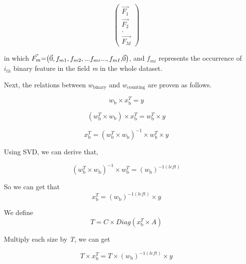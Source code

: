 \documentclass{sig-alternate}
\begin{document}
$$
\begin{pmatrix} 
\vec{F_1} \\
\vec{F_2} \\
.\\
\vec{F_M}

\end{pmatrix}
$$

\noindent in which \($$\vec{F_m}$$ = $$\begin{pmatrix} 
$$\vec{0 }$$ , f_{m1}, f_{m2}, ...f_{mi}... , f_{mI} ,$$\vec{0 }$$ 
\end{pmatrix}$$\), and \(f_{mi}\) represents the occurrence of \(i_{th}\) binary feature in the field \textsl{m} in the whole dataset.\vspace{5mm}

\noindent Next, the relations between \(w_{\text{binary}}\) and \(w_{\text{counting}}\) are proven as follows. 

\begin{equation}
w_{\text{b}} \times x_{\text{b}}^T = y 
\end{equation}

\begin{equation}
(w_{\text{b}}^T \times w_{\text{b}}) \times x_{\text{b}}^T = w_{\text{b}}^T \times y 
\end{equation}

\begin{equation}
x_{\text{b}}^T = (w_{\text{b}}^T \times w_{\text{b}})^{-1} \times w_{\text{b}}^T \times y 
\end{equation}

Using SVD, we can derive that,

\begin{equation}
(w_{\text{b}}^T \times w_{\text{b}})^{-1} \times w_{\text{b}}^T = (w_{\text{b}})^{-1(left)}  
\end{equation}

So we can get that 
\begin{equation}
x_{\text{b}}^T =  (w_{\text{b}})^{-1(left)} \times y 
\end{equation}

We define
\begin{equation}
T = C \times Diag(x_{\text{b}}^T \times A)
\end{equation}


Multiply each size by \textsl{T}, we can get
 
\begin{equation}
T \times x_{\text{b}}^T =  T \times (w_{\text{b}})^{-1(left)} \times y 
\end{equation}
\end{document}
